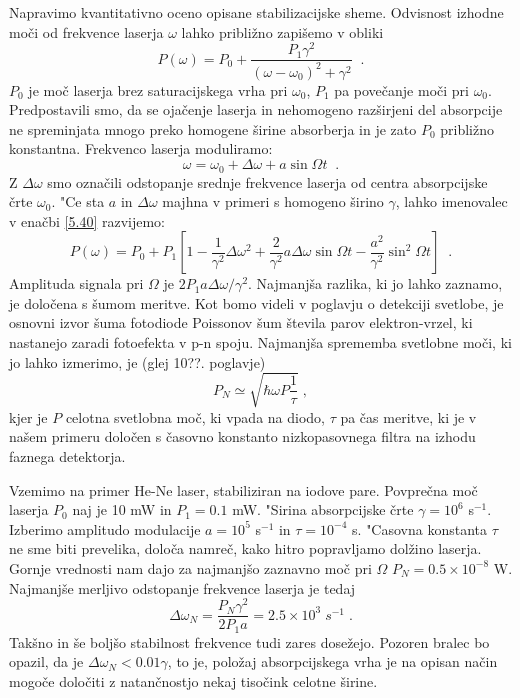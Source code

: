 Napravimo kvantitativno oceno opisane stabilizacijske sheme. Odvisnost
izhodne moči od frekvence laserja $\omega$ lahko približno zapišemo v
obliki 
\begin{equation}  \label{5.40}
P(\omega)=P_0 + \frac{P_1\gamma^2}{(\omega- \omega_0)^2+\gamma^2}\;\;.
\end{equation}
$P_0$ je moč laserja brez saturacijskega vrha pri $\omega_0$, $P_1$ pa
povečanje moči pri $\omega_0$. Predpostavili smo, da se ojačenje laserja
in nehomogeno razširjeni del absorpcije ne spreminjata mnogo preko homogene
širine absorberja in je zato $P_0$ približno konstantna. Frekvenco laserja
moduliramo: 
\begin{equation}  \label{5.41}
\omega=\omega_0+\Delta\omega+a \sin \Omega t\;\;.
\end{equation}
Z $\Delta\omega$ smo označili odstopanje srednje frekvence laserja od
centra absorpcijske črte $\omega_0$. "Ce sta $a$ in $\Delta\omega$ majhna v
primeri s homogeno širino $\gamma$, lahko imenovalec v enačbi \ref{5.40}
razvijemo: 
\begin{equation}  \label{5.42}
P(\omega)=P_0+P_1 [1-\frac{1}{\gamma^2}\Delta\omega^2 +\frac{2}{\gamma^2} a
\Delta\omega \sin\Omega t - \frac{a^2}{\gamma^2}\sin^2\Omega t ]\;\;.
\end{equation}
Amplituda signala pri $\Omega$ je $2P_1 a \Delta\omega/\gamma^2$. Najmanjša
razlika, ki jo lahko zaznamo, je določena s šumom meritve. Kot bomo videli
v poglavju o detekciji svetlobe, je osnovni izvor šuma fotodiode Poissonov
šum števila parov elektron-vrzel, ki nastanejo zaradi fotoefekta v p-n
spoju. Najmanjša sprememba svetlobne moči, ki jo lahko izmerimo, je (glej
10??. poglavje) 
\begin{equation}  \label{5.43}
P_N\simeq \sqrt{\hbar\omega P \frac{1}{\tau}}\;,
\end{equation}
kjer je $P$ celotna svetlobna moč, ki vpada na diodo, $\tau$ pa čas
meritve, ki je v našem primeru določen s časovno konstanto nizkopasovnega
filtra na izhodu faznega detektorja.

Vzemimo na primer He-Ne laser, stabiliziran na iodove pare. Povprečna moč
laserja $P_0$ naj je 10 mW in $P_1=0.1 $ mW. "Sirina absorpcijske črte $%
\gamma= 10^6$ s$^{-1}$. Izberimo amplitudo modulacije $a=10^5$ s$^{-1}$ in $%
\tau=10^{-4}$ s. "Casovna konstanta $\tau$ ne sme biti prevelika, določa
namreč, kako hitro popravljamo dolžino laserja. Gornje vrednosti nam dajo
za najmanjšo zaznavno moč pri $\Omega$ $P_N=0.5\times10^{-8}$ W.
Najmanjše merljivo odstopanje frekvence laserja je tedaj 
\begin{equation}  \label{5.44}
\Delta\omega_N=\frac{P_N \gamma^2}{2P_1 a}=2.5\times 10^3\;s^{-1}\;.
\end{equation}
Takšno in še boljšo stabilnost frekvence tudi zares dosežejo. Pozoren
bralec bo opazil, da je $\Delta\omega_N<0.01 \gamma$, to je, položaj
absorpcijskega vrha je na opisan način mogoče določiti z natančnostjo
nekaj tisočink celotne širine.

